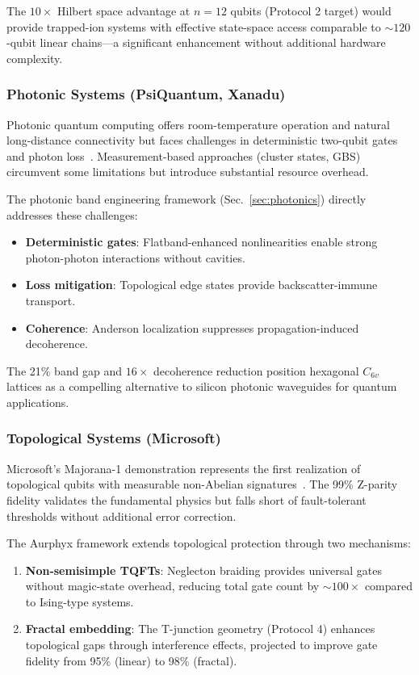 The $10\times$ Hilbert space advantage at $n = 12$ qubits (Protocol 2 target) would provide trapped-ion systems with effective state-space access comparable to $\sim 120$-qubit linear chains—a significant enhancement without additional hardware complexity.

\subsubsection{Photonic Systems (PsiQuantum, Xanadu)}

Photonic quantum computing offers room-temperature operation and natural long-distance connectivity but faces challenges in deterministic two-qubit gates and photon loss~\cite{Wang2020}. Measurement-based approaches (cluster states, GBS) circumvent some limitations but introduce substantial resource overhead.

The photonic band engineering framework (Sec.~\ref{sec:photonics}) directly addresses these challenges:
\begin{itemize}
\item \textbf{Deterministic gates}: Flatband-enhanced nonlinearities enable strong photon-photon interactions without cavities.
\item \textbf{Loss mitigation}: Topological edge states provide backscatter-immune transport.
\item \textbf{Coherence}: Anderson localization suppresses propagation-induced decoherence.
\end{itemize}

The 21\% band gap and $16\times$ decoherence reduction position hexagonal $C_{6v}$ lattices as a compelling alternative to silicon photonic waveguides for quantum applications.

\subsubsection{Topological Systems (Microsoft)}

Microsoft's Majorana-1 demonstration represents the first realization of topological qubits with measurable non-Abelian signatures~\cite{Microsoft2025}. The 99\% Z-parity fidelity validates the fundamental physics but falls short of fault-tolerant thresholds without additional error correction.

The Aurphyx framework extends topological protection through two mechanisms:
\begin{enumerate}
\item \textbf{Non-semisimple TQFTs}: Neglecton braiding provides universal gates without magic-state overhead, reducing total gate count by $\sim 100\times$ compared to Ising-type systems.
\item \textbf{Fractal embedding}: The T-junction geometry (Protocol 4) enhances topological gaps through interference effects, projected to improve gate fidelity from 95\% (linear) to 98\% (fractal).
\end{enumerate}

